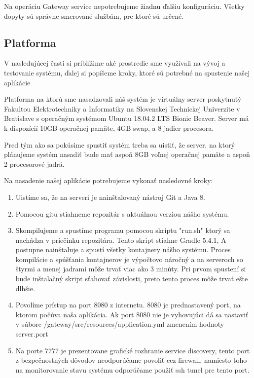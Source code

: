 Na operáciu Gateway service nepotrebujeme žiadnu ďalšiu konfiguráciu. Všetky dopyty sú správne smerované službám, pre ktoré sú určené.

\subsection{Platforma}
V nasledujúcej časti si priblížime aké prostredie sme využívali na vývoj a testovanie systému, ďalej si popíšeme kroky, ktoré sú potrebné na spustenie našej aplikácie

Platforma na ktorú sme nasadzovali náš systém je virtuálny server poskytnutý Fakultou Elektrotechniky a Informatiky na Slovenskej Technickej Univerzite v Bratislave s operačným systémom Ubuntu 18.04.2 LTS Bionic Beaver. Server má k dispozícií 10GB operačnej pamäte, 4GB swap, a 8 jadier procesora.

Pred tým ako sa pokúsime spustiť systém treba sa uistiť, že server, na ktorý plánujeme systém nasadiť bude mať aspoň 8GB voľnej operačnej pamäte a aspoň 2 procesorové jadrá.

Na nasadenie našej aplikácie potrebujeme vykonať nasledovné kroky:
\begin{enumerate}
    \item Uistíme sa, že na serveri je nainštalovaný nástroj Git a Java 8.
	\item Pomocou gitu stiahneme repozitár \cite{dp_repo} s aktuálnou verziou nášho systému.
    \item Skompilujeme a spustíme programu pomocou skriptu "run.sh" ktorý sa nachádza v priečinku repozitára. Tento skript stiahne Gradle 5.4.1, A postupne nainštaluje a spustí všetky kontajnery nášho systému.
	Proces kompilácie a spúšťania kontajnerov je výpočtovo náročný a na serveroch so štyrmi a menej jadrami môže trvať viac ako 3 minúty. Pri prvom spustení si bude inštalačný skript sťahovať závislosti, preto tento proces môže trvať ešte dlhšie.
    \item Povolíme prístup na port 8080 z internetu. 8080 je prednastavený port, na ktorom počúva naša aplikácia. Ak port 8080 nie je vyhovujúci dá sa nastaviť v súbore /gateway/src/resources/application.yml zmenením hodnoty server.port
    \item Na porte 7777 je prezentovane grafické rozhranie service discovery, tento port z bezpečnostných dôvodov neodporúčame povoliť cez firewall, namiesto toho na monitorovanie stavu systému odporúčame použiť ssh tunel pre tento port.
\end{enumerate}



